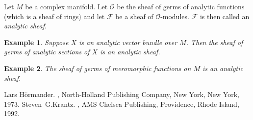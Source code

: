 \documentclass[12pt]{article}
\theoremstyle{theorem}
\newtheorem*{example}{Example}
\theoremstyle{definition}
\theoremstyle{remark}
\begin{document}
Let $M$ be a complex manifold.  Let $\mathcal{O}$ be the sheaf of germs of analytic functions (which is a sheaf of rings) and let $\mathcal{F}$ be a sheaf of $\mathcal{O}$-modules.  $\mathcal{F}$ is then called an \emph{analytic sheaf}.

\begin{example}
Suppose $X$ is an analytic vector bundle over $M$.  Then the sheaf of germs of analytic sections of $X$
is an analytic sheaf.
\end{example}

\begin{example}
The sheaf of germs of meromorphic functions on $M$ is an analytic sheaf.
\end{example}

\begin{thebibliography}{9}
Lars H\"ormander.
{\em {}},
North-Holland Publishing Company, New York, New York, 1973.
Steven~G.\@ Krantz.
{\em {}},
AMS Chelsea Publishing, Providence, Rhode Island, 1992.
\end{thebibliography}
\end{document}
